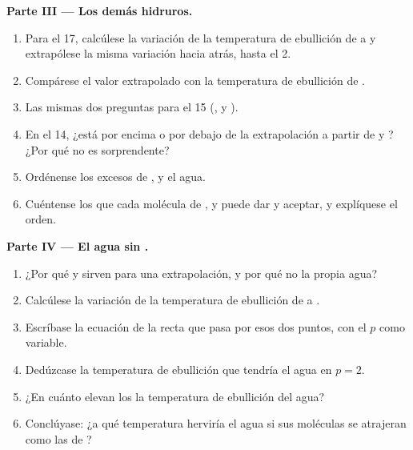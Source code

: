 \begin{problem}
\medskip
\noindent\textbf{Parte III --- Los demás hidruros.}
\begin{enumerate}[resume]
  \item Para el  17, calcúlese la variación de la temperatura de
        ebullición de  a  y extrapólese la misma
        variación hacia atrás, hasta el  2.
  \item Compárese el valor extrapolado con la temperatura de ebullición
        de .
  \item Las mismas dos preguntas para el  15 (,  y
        ).
  \item En el  14, ¿está  por encima o por debajo de la
        extrapolación a partir de  y ? ¿Por qué no es
        sorprendente?
  \item Ordénense los excesos de ,  y el agua.
  \item Cuéntense los  que cada molécula de ,
         y  puede dar y aceptar, y explíquese el orden.
\end{enumerate}

\medskip
\noindent\textbf{Parte IV --- El agua sin .}
\begin{enumerate}[resume]
  \item ¿Por qué  y  sirven para una extrapolación, y
        por qué no la propia agua?
  \item Calcúlese la variación de la temperatura de ebullición de
         a .
  \item Escríbase la ecuación de la recta que pasa por esos dos puntos,
        con el  $p$ como variable.
  \item Dedúzcase la temperatura de ebullición que tendría el agua en
        $p = 2$.
  \item ¿En cuánto elevan los  la temperatura de
        ebullición del agua?
  \item Conclúyase: ¿a qué temperatura herviría el agua si sus moléculas
        se atrajeran como las de ?
\end{enumerate}
\end{problem}
